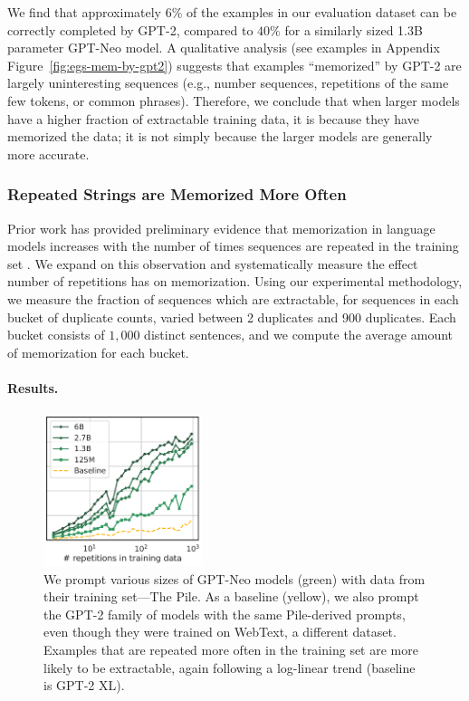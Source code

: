 We find that approximately $6\%$ of the examples in our evaluation dataset can be correctly 
completed by GPT-2, compared to $40\%$ for a similarly sized 1.3B parameter GPT-Neo model. 
A qualitative analysis (see examples in Appendix Figure~\ref{fig:egs-mem-by-gpt2}) suggests that examples ``memorized'' by GPT-2 are largely uninteresting
sequences (e.g., number sequences, repetitions of the same few tokens, or common phrases).
%
Therefore, we conclude that when larger models have a higher fraction of extractable training data,
it is because they have memorized the data; it is not simply because the larger models are generally more accurate.


\subsubsection{Repeated Strings are Memorized More Often}
\label{sec:duplicates}
Prior work has provided preliminary evidence that memorization in language models increases with the number of times sequences are repeated in the training set \citep{carlini2020extracting, lee2021deduplicating}.
%
We expand on this observation and systematically measure the effect number of repetitions has on memorization.
%
Using our experimental methodology, we measure the fraction of sequences which are extractable, for sequences in each bucket of duplicate counts, varied between 2 duplicates and 900 duplicates.
Each bucket consists of $1{,}000$ distinct sentences, and we compute the average amount of memorization for each bucket.


\paragraph{Results.}

\begin{figure}[ht]
        \includegraphics[height=12em]{figures/exactly_mem-vs-repetitions-mean-xlabel-markers.pdf} %
        \centering
        \caption{We prompt various sizes of GPT-Neo models (green) with data from their training set---The Pile. 
    As a baseline (yellow), we also prompt the GPT-2 family of models with the same Pile-derived prompts, even though they were trained on WebText, a different dataset.
    Examples that are repeated more often in the training set are more likely to be extractable,
    again following a log-linear trend (baseline is GPT-2 XL). 
    }
    \label{fig:main-res-dups}
\end{figure}

